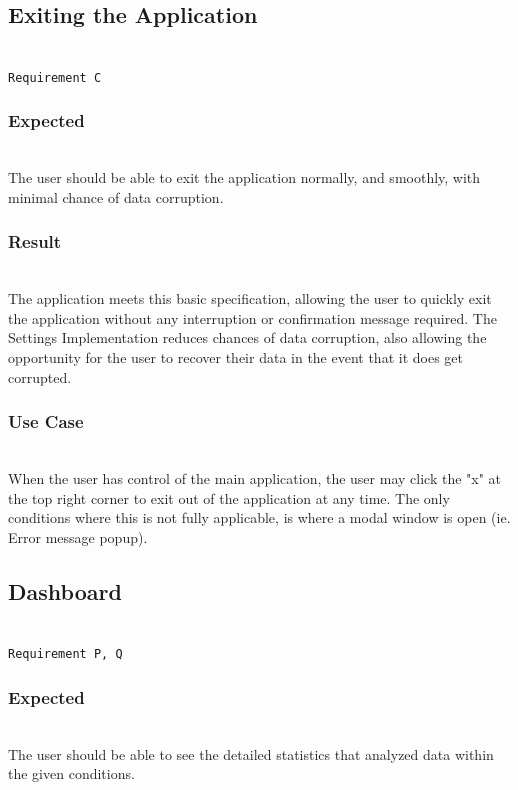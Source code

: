 \documentclass[conference]{IEEEtran}
\begin{document}
\newpage
\subsection{Exiting the Application}~\\
\texttt{Requirement C}~\\
\subsubsection{Expected}~\\
The user should be able to exit the application normally, and smoothly, with minimal chance of data corruption.~\\

\subsubsection{Result}~\\
The application meets this basic specification, allowing the user to quickly exit the application without any interruption or confirmation message required. The Settings Implementation reduces chances of data corruption, also allowing the opportunity for the user to recover their data in the event that it does get corrupted.~\\

\subsubsection{Use Case}~\\
When the user has control of the main application, the user may click the "x" at the top right corner to exit out of the application at any time. The only conditions where this is not fully applicable, is where a modal window is open (ie. Error message popup).\\

\subsection{Dashboard}~\\
\texttt{Requirement P, Q}~\\
\subsubsection{Expected}~\\
The user should be able to see the detailed statistics that analyzed data within the given conditions.~\\
\end{document}
